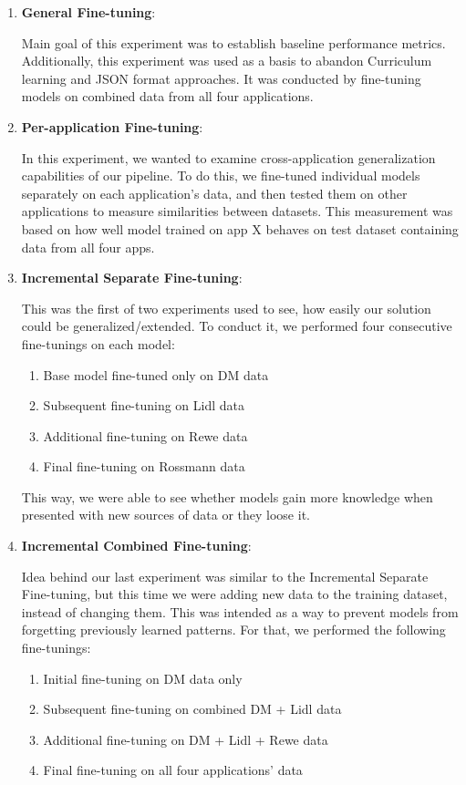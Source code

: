 \documentclass[licencjacka,en]{pracamgr}
\begin{document}
\begin{enumerate}
    \item \textbf{General Fine-tuning}:

    Main goal of this experiment was to establish baseline performance metrics. Additionally, this experiment was used as a basis to abandon
    Curriculum learning and JSON format approaches. It was conducted by fine-tuning models on combined data from all four applications.

    \item \textbf{Per-application Fine-tuning}:

    In this experiment, we wanted to examine cross-application generalization capabilities of our pipeline. To do this, we fine-tuned individual models separately on each application's data, and then tested them on other applications to measure similarities between datasets. This measurement was based on how well model trained on app X behaves on test dataset containing data from all four apps.

    \item \textbf{Incremental Separate Fine-tuning}:

    This was the first of two experiments used to see, how easily our solution could be generalized/extended. To conduct it, we performed four consecutive fine-tunings on each model:

    \begin{enumerate}
        \item Base model fine-tuned only on DM data
        \item Subsequent fine-tuning on Lidl data
        \item Additional fine-tuning on Rewe data
        \item Final fine-tuning on Rossmann data
    \end{enumerate}
    This way, we were able to see whether models gain more knowledge when presented with new sources of data or they loose it.

    \item \textbf{Incremental Combined Fine-tuning}:

    Idea behind our last experiment was similar to the Incremental Separate Fine-tuning, but this time we were adding new data to the training dataset, instead of changing them. This was intended as a way to prevent models from forgetting previously learned patterns. For that, we performed the following fine-tunings:
    \begin{enumerate}
        \item Initial fine-tuning on DM data only
        \item Subsequent fine-tuning on combined DM + Lidl data
        \item Additional fine-tuning on DM + Lidl + Rewe data
        \item Final fine-tuning on all four applications' data
    \end{enumerate}
\end{enumerate}
\end{document}
